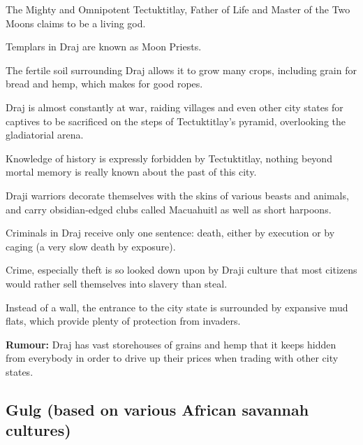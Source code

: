 \begin{multicols}{2}
\begin{description}
    \item The Mighty and Omnipotent Tectuktitlay, Father of Life and Master of the Two Moons claims to be a living god.
    \item Templars in Draj are known as Moon Priests.
    \item The fertile soil surrounding Draj allows it to grow many crops, including grain for bread and hemp, which makes for good ropes.
    \item Draj is almost constantly at war, raiding villages and even other city states for captives to be sacrificed on the steps of Tectuktitlay’s pyramid, overlooking the gladiatorial arena.
    \item Knowledge of history is expressly forbidden by Tectuktitlay, nothing beyond mortal memory is really known about the past of this city.
    \item Draji warriors decorate themselves with the skins of various beasts and animals, and carry obsidian-edged clubs called Macuahuitl as well as short harpoons.
    \item Criminals in Draj receive only one sentence: death, either by execution or by caging (a very slow death by exposure).
    \item Crime, especially theft is so looked down upon by Draji culture that most citizens would rather sell themselves into slavery than steal.
    \item Instead of a wall, the entrance to the city state is surrounded by expansive mud flats, which provide plenty of protection from invaders.
    \item \textbf{Rumour:} Draj has vast storehouses of grains and hemp that it keeps hidden from everybody in order to drive up their prices when trading with other city states.
\end{description}

\subsection{Gulg (based on various African savannah cultures)}


\end{multicols}

